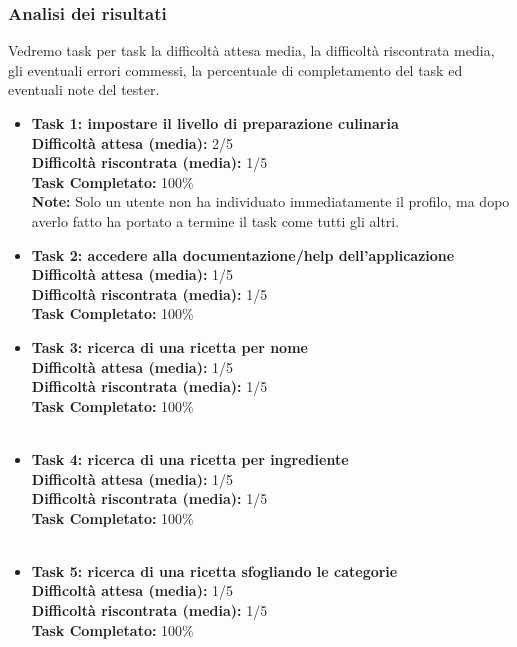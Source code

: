 \subsubsection*{Analisi dei risultati}
Vedremo task per task la difficoltà attesa media, la difficoltà
 riscontrata media, gli eventuali errori commessi, la percentuale di
completamento del task ed eventuali note del tester.
\begin{itemize}

\item 
\textbf{Task 1: impostare il livello di preparazione culinaria}\\
\textbf{Difficoltà attesa (media):} 2/5\\
\textbf{Difficoltà riscontrata (media):} 1/5\\
\textbf{Task Completato:} 100\%\\
\textbf{Note:} Solo un utente non ha individuato immediatamente il
profilo, ma dopo averlo fatto ha portato a termine il task come tutti
gli altri.\\

\item
\textbf{Task 2: accedere alla documentazione/help dell'applicazione}\\
\textbf{Difficoltà attesa (media):} 1/5\\
\textbf{Difficoltà riscontrata (media):} 1/5\\
\textbf{Task Completato:} 100\%\\

\item
\textbf{Task 3: ricerca di una ricetta per nome}\\
\textbf{Difficoltà attesa (media):} 1/5\\
\textbf{Difficoltà riscontrata (media):} 1/5\\
\textbf{Task Completato:} 100\%\\\\

\item
\textbf{Task 4: ricerca di una ricetta per ingrediente}\\
\textbf{Difficoltà attesa (media):} 1/5\\
\textbf{Difficoltà riscontrata (media):} 1/5\\
\textbf{Task Completato:} 100\%\\\\

\item
\textbf{Task 5: ricerca di una ricetta sfogliando le categorie}\\
\textbf{Difficoltà attesa (media):} 1/5\\
\textbf{Difficoltà riscontrata (media):} 1/5\\
\textbf{Task Completato:} 100\%\\\\


\end{itemize}
